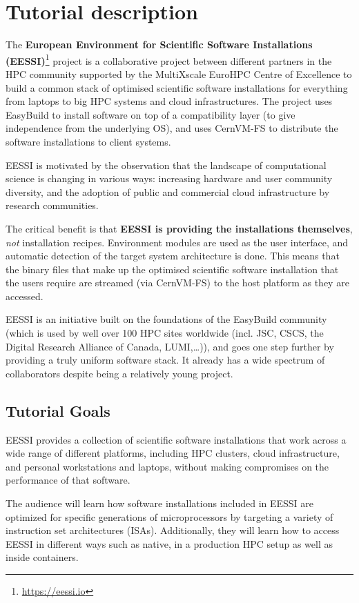 \section*{Tutorial description}

The \textbf{European Environment for Scientific Software Installations
(EESSI)}\footnote{\href{https://eessi.io}{https://eessi.io}} project is a collaborative project
between different partners in the HPC community supported by the MultiXscale EuroHPC Centre of Excellence to build a
common stack of optimised scientific software installations for everything from laptops to big HPC systems and cloud
infrastructures.
The project uses EasyBuild to install software on top of a compatibility layer (to give independence from the underlying
OS), and uses CernVM-FS to
distribute the software installations to client systems.

EESSI is motivated by the observation that the landscape of computational science is changing in
various ways: increasing hardware and user community diversity, and the adoption of public and commercial cloud
infrastructure by research communities.

The critical benefit is that \textbf{EESSI is providing the
installations themselves}, \textit{not} installation recipes.
Environment modules are used as the user interface, and automatic
detection of the target system architecture is done.
This means that the binary files that make up the optimised
scientific software installation that the users require are streamed (via CernVM-FS) to the host
platform as they are accessed.

EESSI is an initiative built on the foundations of the EasyBuild community (which is used by well over
100 HPC sites worldwide (incl. JSC, CSCS, the Digital Research Alliance of Canada, LUMI,\ldots)), and goes one
step further by providing a truly uniform software stack.
It already has a wide spectrum of collaborators despite being a relatively young project.

\subsection*{Tutorial Goals}

EESSI provides a collection of scientific software installations that work across a wide range of
different platforms, including HPC clusters, cloud infrastructure, and personal workstations and laptops, without making
compromises on the performance of that software.

The audience will learn how software installations included in EESSI are optimized for specific generations
of microprocessors by targeting a
variety of instruction set architectures (ISAs). Additionally, they will learn how to access EESSI in different ways such as native,
in a production HPC setup as well as inside containers.

